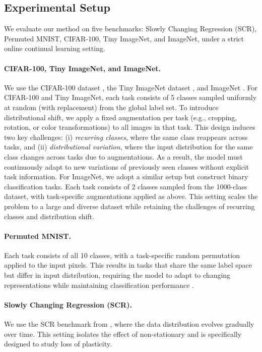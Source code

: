 \documentclass{article}
\begin{document}
\subsection{Experimental Setup}

We evaluate our method on five benchmarks: Slowly Changing Regression (SCR), Permuted MNIST, CIFAR-100, Tiny ImageNet, and ImageNet, under a strict online continual learning setting.


\paragraph{CIFAR-100, Tiny ImageNet, and ImageNet.}
We use the CIFAR-100 dataset \citep{krizhevsky2009learning}, the Tiny ImageNet dataset \citep{tinyimagenet}, and ImageNet \citep{deng2009imagenet}. For CIFAR-100 and Tiny ImageNet, each task consists of 5 classes sampled uniformly at random (with replacement) from the global label set. To introduce distributional shift, we apply a fixed augmentation per task (e.g., cropping, rotation, or color transformations) to all images in that task. This design induces two key challenges: (i) \emph{recurring classes}, where the same class reappears across tasks, and (ii) \emph{distributional variation}, where the input distribution for the same class changes across tasks due to augmentations. As a result, the model must continuously adapt to new variations of previously seen classes without explicit task information.
For ImageNet, we adopt a similar setup but construct binary classification tasks. Each task consists of 2 classes sampled from the 1000-class dataset, with task-specific augmentations applied as above. This setting scales the problem to a large and diverse dataset while retaining the challenges of recurring classes and distribution shift.
\paragraph{Permuted MNIST.}
Each task consists of all 10 classes, with a task-specific random permutation applied to the input pixels. This results in tasks that share the same label space but differ in input distribution, requiring the model to adapt to changing representations while maintaining classification performance \citep{goodfellow2013empirical}.
\paragraph{Slowly Changing Regression (SCR).}
We use the SCR benchmark from \citep{dohare2024loss}, where the data distribution evolves gradually over time. This setting isolates the effect of non-stationary and is specifically designed to study loss of plasticity.
\end{document}
